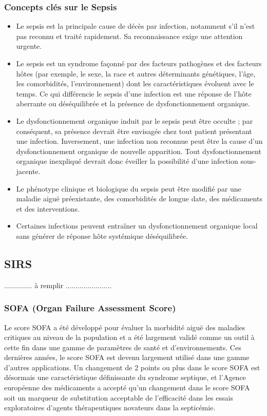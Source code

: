 \documentclass[a4paper,12pt]{article}
\begin{document}
\subsubsection{Concepts clés sur le Sepsis}
\begin{itemize}
	\setlength{\itemsep}{1pt}%
	\item Le sepsis est la principale cause de décès par infection, notamment s'il n'est pas reconnu et traité rapidement. Sa reconnaissance exige une attention urgente.
	\item Le sepsis est un syndrome façonné par des facteurs pathogènes et des facteurs hôtes (par exemple, le sexe, la race et autres déterminants génétiques, l'âge, les comorbidités, l'environnement) dont les caractéristiques évoluent avec le temps. Ce qui différencie le sepsis d'une infection est une réponse de l'hôte aberrante ou déséquilibrée et la présence de dysfonctionnement organique.
	\item Le dysfonctionnement organique induit par le sepsis peut être occulte ; par conséquent, sa présence devrait être envisagée chez tout patient présentant une infection. Inversement, une infection non reconnue peut être la cause d'un dysfonctionnement organique de nouvelle apparition. Tout dysfonctionnement organique inexpliqué devrait donc éveiller la possibilité d'une infection sous-jacente.
	\item Le phénotype clinique et biologique du sepsis peut être modifié par une maladie aiguë préexistante, des comorbidités de longue date, des médicaments et des interventions.
	\item Certaines infections peuvent entraîner un dysfonctionnement organique local sans générer de réponse hôte systémique déséquilibrée.
\end{itemize}

\subsection{SIRS }
.............. à remplir .......................\\

\subsubsection{SOFA (Organ Failure Assessment Score)}
Le score SOFA a été développé pour évaluer la morbidité aiguë des maladies critiques au niveau de la population et a été largement validé comme un outil à cette fin dans une gamme de paramètres de santé et d'environnements.
Ces dernières années, le score SOFA est devenu largement utilisé dans une gamme d'autres applications. Un changement de 2 points ou plus dans le score SOFA est désormais une caractéristique définissante du syndrome septique, et l'Agence européenne des médicaments a accepté qu'un changement dans le score SOFA soit un marqueur de substitution acceptable de l'efficacité dans les essais exploratoires d'agents thérapeutiques novateurs dans la septicémie. \cite{lambden2019sofa} \\ 
\end{document}
